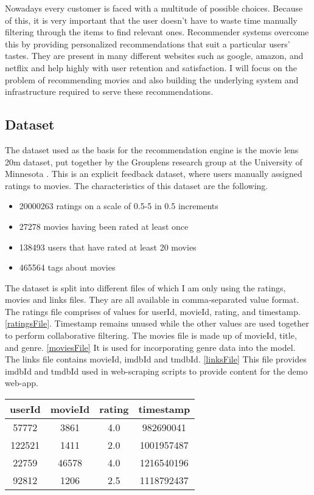 Nowadays every customer is faced with a multitude of possible choices. Because of this, it is very important that the user doesn't have to waste time manually filtering through the items to find relevant ones. Recommender systems overcome this by providing personalized recommendations that suit a particular users' tastes. They are present in many different websites such as google, amazon, and netflix and help highly with user retention and satisfaction. I will focus on the problem of recommending movies and also building the underlying system and infrastructure required to serve these recommendations.

\subsection{Dataset}
The dataset used as the basis for the recommendation engine is the movie lens 20m dataset, put together by the Grouplens research group at the University of Minnesota \citet{movielens}.
This is an explicit feedback dataset, where users manually assigned ratings to movies. The characteristics of this dataset are the following.
\begin{itemize}
    \item 20000263 ratings on a scale of 0.5-5 in 0.5 increments
    \item 27278 movies having been rated at least once
    \item 138493 users that have rated at least 20 movies
    \item 465564 tags about movies
\end{itemize}
The dataset is split into different files of which I am only using the ratings, movies and links files. 
They are all available in comma-separated value format.
The ratings file comprises of values for userId, movieId, rating, and timestamp.\ref{ratingsFile}. Timestamp remains unused while the other values are used together to perform collaborative filtering.
The movies file is made up of movieId, title, and genre. \ref{moviesFile} It is used for incorporating genre data into the model.
The links file contains movieId, imdbId and tmdbId. \ref{linksFile} This file provides imdbId and tmdbId used in web-scraping scripts to provide content for the demo web-app.

\begin{center}
    \begin{tabular}{||c c c c||} 
    \hline
    userId & movieId & rating & timestamp \\ [0.5ex] 
    \hline\hline
    57772 & 3861 & 4.0 & 982690041 \\ 
    \hline
    122521 & 1411 & 2.0 & 1001957487 \\
    \hline
    22759 & 46578 & 4.0 & 1216540196 \\
    \hline
    92812 & 1206 & 2.5 & 1118792437 \\ [1ex] 
    \hline
   \end{tabular}
\label{ratingsFile}
\end{center}

